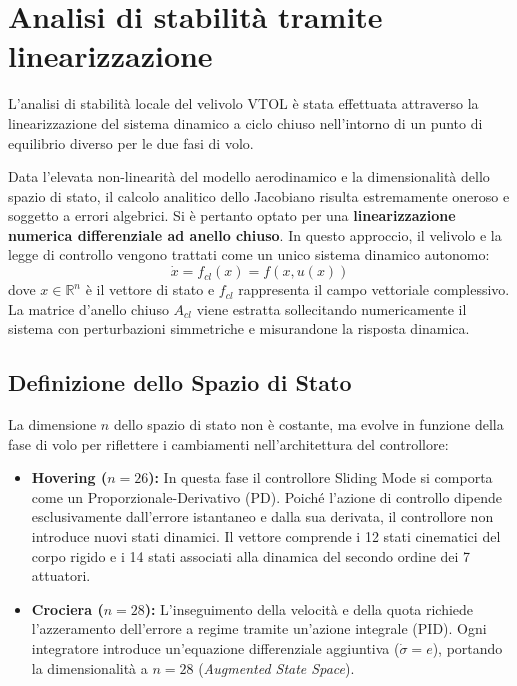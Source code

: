 \section{Analisi di stabilità tramite linearizzazione}
L'analisi di stabilità locale del velivolo VTOL è stata effettuata attraverso la linearizzazione del sistema dinamico a ciclo chiuso nell'intorno di un punto di equilibrio diverso per le due fasi di volo.

Data l'elevata non-linearità del modello aerodinamico e la dimensionalità dello spazio di stato, il calcolo analitico dello Jacobiano risulta estremamente oneroso e soggetto a errori algebrici. Si è pertanto optato per una \textbf{linearizzazione numerica differenziale ad anello chiuso}. In questo approccio, il velivolo e la legge di controllo vengono trattati come un unico sistema dinamico autonomo:
\begin{equation}
    \dot{x} = f_{cl}(x) = f(x, u(x))
\end{equation}
dove $x \in \mathbb{R}^n$ è il vettore di stato e $f_{cl}$ rappresenta il campo vettoriale complessivo. La matrice d'anello chiuso $A_{cl}$ viene estratta sollecitando numericamente il sistema con perturbazioni simmetriche e misurandone la risposta dinamica.

\subsection{Definizione dello Spazio di Stato}
La dimensione $n$ dello spazio di stato non è costante, ma evolve in funzione della fase di volo per riflettere i cambiamenti nell'architettura del controllore:
\begin{itemize}
    \item \textbf{Hovering ($n=26$):} In questa fase il controllore Sliding Mode si comporta come un Proporzionale-Derivativo (PD). Poiché l'azione di controllo dipende esclusivamente dall'errore istantaneo e dalla sua derivata, il controllore non introduce nuovi stati dinamici. Il vettore comprende i 12 stati cinematici del corpo rigido e i 14 stati associati alla dinamica del secondo ordine dei 7 attuatori.
    \item \textbf{Crociera ($n=28$):} L'inseguimento della velocità e della quota richiede l'azzeramento dell'errore a regime tramite un'azione integrale (PID). Ogni integratore introduce un'equazione differenziale aggiuntiva ($\dot{\sigma} = e$), portando la dimensionalità a $n=28$ (\textit{Augmented State Space}).
\end{itemize}

